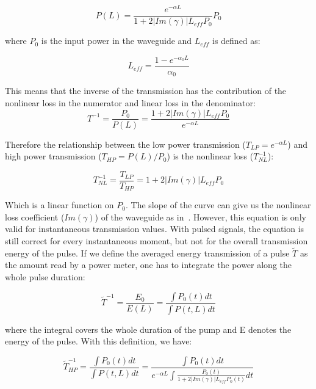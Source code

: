 \begin{equation}
 P(L) = \frac{e^{-\alpha L}}{1+2|Im(\gamma)| L_{eff} P_0} P_0
\end{equation}

where $P_0$ is the input power in the waveguide and $L_{eff}$ is defined as:

\begin{equation}
 L_{eff} = \frac{1-e^{-\alpha_0L}}{\alpha_0}
\end{equation}


This means that the inverse of the transmission has the contribution of the nonlinear loss in the numerator and linear loss in the denominator:
\begin{equation}
 T^{-1} = \frac{P_0}{P(L)} = \frac{1+2|Im(\gamma)| L_{eff} P_0}{e^{-\alpha L}}
\end{equation}

Therefore the relationship between the low power transmission  ($T_{LP} = e^{-\alpha L} $) and high power transmission ($T_{HP} = P(L)/P_0 $) is the nonlinear loss ($T^{-1}_{NL}$):

\begin{equation}
 T^{-1}_{NL} = \frac{T_{LP}}{T_{HP}} = 1+2|Im(\gamma)| L_{eff} P_0
\label{eq:transmissionLinearImGamma}
\end{equation}

Which is a linear function on $P_0$.
The slope of the curve can give us the nonlinear loss coefficient ($Im(\gamma)$) of the waveguide as in~\cite{Vallaitis2009}.
However, this equation is only valid for instantaneous transmission values.
With pulsed signals, the equation is still correct for every instantaneous moment, but not for the overall transmission energy of the pulse.
If we define the averaged energy transmission of a pulse $ \tilde{T} $ as the amount read by a power meter, one has to integrate the power along the whole pulse duration:

\begin{equation}
 \tilde{T}^{-1} = \frac{E_0}{E(L)} = \frac{\int P_0(t)dt}{\int P(t,L)dt}
\end{equation}

where the integral covers the whole duration of the pump and E denotes the energy of the pulse.
With this definition, we have:


\begin{equation}
 \tilde{T}_{HP}^{-1}  = \frac{\int P_0(t)dt}{\int P(t,L)dt} = \frac{\int P_0(t)dt} {e^{-\alpha L} \int \frac{P_0(t)}{1+2|Im(\gamma)| L_{eff} P_0(t)} dt}
\end{equation}

